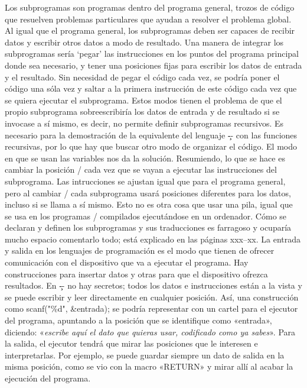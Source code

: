 %
Los subprogramas son programas dentro del programa general, trozos de código que resuelven problemas
particulares que ayudan a resolver el problema global. Al igual que el programa general, los
subprogramas deben ser capaces de recibir datos y escribir otros datos a modo de resultado. Una
manera de integrar los subprogramas sería ‘pegar’ las instrucciones en los puntos del programa
principal donde sea necesario, y tener una posiciones fijas para escribir los datos de entrada y el
resultado. Sin necesidad de pegar el código cada vez, se podría poner el código una sóla vez y
saltar a la primera instrucción de este código cada vez que se quiera ejecutar el subprograma. Estos
modos tienen el problema de que el propio subprograma sobreescribiría los datos de entrada y de
resultado si se invocase a sí mismo, es decir, no permite definir subprogramas recursivos. Es
necesario para la demostración de la equivalente del lenguaje \c-- con las funciones recursivas, por
lo que hay que buscar otro modo de organizar el código. El modo en que se usan las variables nos da
la solución. Resumiendo, lo que se hace es cambiar la posición \top/ cada vez que se vayan a
ejecutar las instrucciones del subprograma. Las intrucciones se ajustan igual que para el programa
ge\-ne\-ral, pero al cambiar \top/ cada subprograma usará posiciones diferentes para los datos, incluso
si se llama a sí mismo. Esto no es otra cosa que usar una pila, igual que se usa en los
programas \C/ compilados ejecutándose en un ordenador. Cómo se declaran y definen los subprogramas y
sus traducciones es farragoso y ocuparía mucho espacio comentarlo todo; está explicado en las
páginas xxx--xx.
\vskip3pt\vskip0pt
% 
La entrada y salida en los lenguajes de programación es el modo que tienen de ofrecer comunicación
con el dispositivo que va a ejecutar el programa. Hay cons\-truc\-ciones para insertar datos y otras
para que el dispositivo ofrezca resultados. En \c-- no hay secretos; todos los datos e instrucciones
están a la vista y se puede escribir y leer directamente en cualquier posición. Así, una
construcción como
\encaje
\fcode scanf("\%d", \&entrada);
\finencaje
se podría representar con un cartel para el ejecutor del programa, apuntando a la posición que se
identifique como «{\fcode entrada}», diciendo: «{\it escribe aquí el dato que quieras usar,
codificado como ya sabes}». Para la salida, el ejecutor tendrá que mirar las posiciones que le
interesen e interpretarlas. Por ejemplo, se puede guardar siempre un dato de salida en la misma
posición, como se vio con la macro «{\fcode RETURN}» y mirar allí al acabar la ejecución del
programa.
